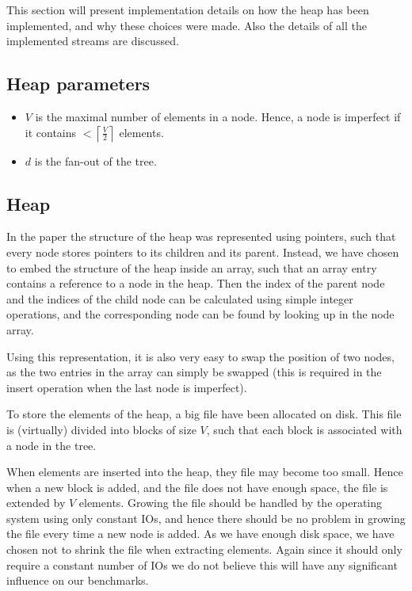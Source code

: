 This section will present implementation details on how the heap has
been implemented, and why these choices were made. Also the details of
all the implemented streams are discussed.

\subsection{Heap parameters}
\label{sec:implementation:parameters}
\begin{itemize}
  \item $V$ is the maximal number of elements in a node. Hence, a
    node is imperfect if it contains $< \left\lceil \frac{V}{2}
    \right\rceil$ elements.
  \item $d$ is the fan-out of the tree.
\end{itemize}

\subsection{Heap}
In the paper the structure of the heap was represented using pointers,
such that every node stores pointers to its children and its
parent. Instead, we have chosen to embed the structure of the heap
inside an array, such that an array entry contains a reference to a
node in the heap. Then the index of the parent node and the indices of
the child node can be calculated using simple integer operations, and
the corresponding node can be found by looking up in the node array.

Using this representation, it is also very easy to swap the position
of two nodes, as the two entries in the array can simply be swapped
(this is required in the insert operation when the last node is
imperfect).

To store the elements of the heap, a big file have been allocated on
disk. This file is (virtually) divided into blocks of size $V$, such
that each block is associated with a node in the tree.

When elements are inserted into the heap, they file may become too
small. Hence when a new block is added, and the file does not have
enough space, the file is extended by $V$ elements. Growing the file
should be handled by the operating system using only constant IOs, and
hence there should be no problem in growing the file every time a new
node is added. As we have enough disk space, we have chosen not to
shrink the file when extracting elements. Again since it should only
require a constant number of IOs we do not believe this will have any
significant influence on our benchmarks.

